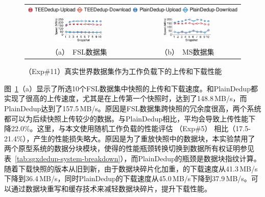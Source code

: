 \begin{figure}[t]
  \centering
  \begin{tabular}{@{\ }c@{\ }c}
  \multicolumn{2}{c}{\includegraphics[width=\textwidth]{pic/sgxdedup/expb2_trace_legend.pdf}} \\
  \hspace{-0.1in}
  \includegraphics[width=0.47\textwidth]{pic/sgxdedup/expb2_trace_fsl_plain_sgx.pdf} &
  \includegraphics[width=0.47\textwidth]{pic/sgxdedup/expb2_trace_ms_plain_sgx.pdf}\\
  \mbox{\small （a） FSL数据集} &
  \mbox{\small （b） MS数据集}
  \end{tabular}
  \caption{（Exp\#11）真实世界数据集作为工作负载下的上传和下载性能}
  \label{fig:sgxdedup-tracePerformance}
\end{figure}

图~\ref{fig:sgxdedup-tracePerformance}（a）显示了所选10个FSL数据集中快照的上传和下载速度。\sysnameS 和PlainDedup都实现了很高的上传速度，尤其是在上传第一个快照时，\sysnameS 达到了148.8\,MB/s，而PlainDedup达到了157.5\,MB/s。原因是FSL数据集跨快照的冗余度很高，两个系统都可以为后续快照上传较少的数据。与PlainDedup相比，\sysnameS 平均会导致上传性能下降22.0\%。这里，与本文使用随机工作负载的性能评估 （Exp\#5） 相比（17.5-21.4\%），产生的性能损失略大。原因是为了重放快照中的数据块，本实验禁用了两个原型系统的数据分块模块，使得\sysnameS 的性能瓶颈转换切换到数据所有权证明参见表~\ref{tab:sgxdedup-system-breakdown}），而PlainDedup的瓶颈是数据块指纹计算。随着下载快照的版本从旧到新，由于数据块碎片化\cite{lillibridge13}加重，\sysnameS 的下载速度从41.3\,MB/s下降到36.4\,MB/s，同时PlainDedup的下载速度从45.0\,MB/s下降到37.9\,MB/s。\sysnameS 可以通过数据块重写和缓存\cite{lillibridge13,cao2018ALACC}技术来减轻数据块碎片，提升下载性能。

